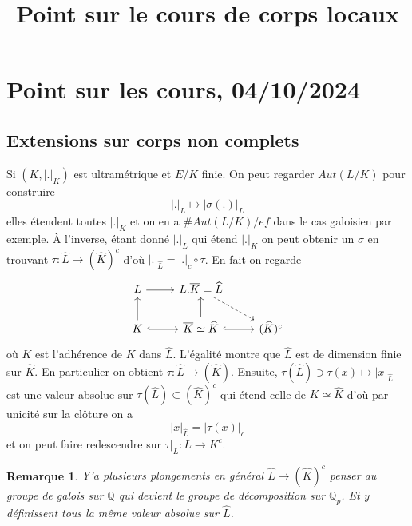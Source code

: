 \documentclass[a4paper,12pt]{book}
\title{Point sur le cours de corps locaux }
\date{}
\newcommand{\Q}{\mathbb{Q}}
\theoremstyle{plain}
\newtheorem{rem}{Remarque}
\theoremstyle{definition}
\theoremstyle{remark}
\begin{document}
\maketitle

\section*{Point sur les cours, 04/10/2024}
\subsection*{Extensions sur corps non complets}
Si $(K, |.|_K)$ est ultramétrique et $E/K$ finie. On peut regarder
$Aut(L/K)$ pour construire
\[|.|_L\mapsto |\sigma(.)|_L\]
elles étendent toutes $|.|_K$ et on en a $\#Aut(L/K)/ef$ dans le cas
galoisien par exemple. À l'inverse, 
étant donné $|.|_L$ qui étend $|.|_K$ on peut obtenir un $\sigma$ en
trouvant $\tau\colon \widehat L\to (\widehat{K})^c$ d'où
$|.|_{\widehat L}= |.|_c\circ\tau$. En fait on regarde 
\[\begin{tikzcd}
	L & {L.\overline K=\widehat L} \\
	K & {\overline K\simeq \widehat K} & {(\widehat K)^c}
	\arrow[from=1-1, to=1-2]
	\arrow[dashed, from=1-2, to=2-3]
	\arrow[from=2-1, to=1-1]
	\arrow[hook, from=2-1, to=2-2]
	\arrow[from=2-2, to=1-2]
	\arrow[hook, from=2-2, to=2-3]
\end{tikzcd}\]
où $\overline K$ est l'adhérence de $K$ dans $\widehat L$. L'égalité
montre que $\widehat L$ est de dimension finie sur $\widehat K$. En
particulier on obtient $\tau \colon \widehat L\to (\widehat K)$. Ensuite,
$\tau(\widehat L)\ni\tau(x)\mapsto |x|_{\widehat L}$ est une valeur 
absolue sur $\tau(\widehat L)\subset (\widehat K)^c$ qui étend celle
de $\overline K\simeq \widehat K$ d'où par unicité sur la clôture on a
\[|x|_{\widehat L}=|\tau(x)|_c\]
et on peut faire redescendre sur $\tau|_L\colon L\to K^c$. 
\begin{rem}
    Y'a plusieurs plongements en général $\widehat L \to (\widehat K)^c$
    penser au groupe de galois sur $\Q$ qui devient le groupe de 
    décomposition sur $\Q_p$. Et y définissent tous la même valeur
    absolue sur $\widehat L$.
\end{rem}
\end{document}
